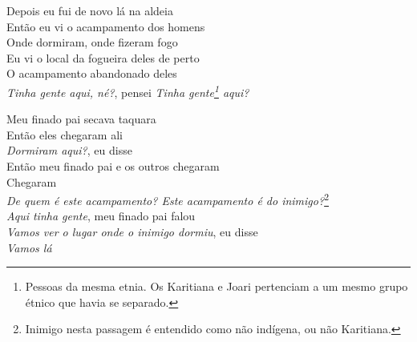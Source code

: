 \begin{linenumbers}\begingroup\raggedright
 
\noindent   Depois eu fui de novo lá na aldeia\\
  Então eu vi o acampamento dos homens\\
  Onde dormiram, onde fizeram fogo\\
  Eu vi o local da fogueira deles de perto\\
  O acampamento abandonado deles\\
  \textit{Tinha gente aqui, né?}, pensei \textit{Tinha gente\footnote{Pessoas da
   mesma etnia. Os Karitiana e Joari pertenciam a um mesmo grupo étnico
   que havia se separado.} aqui?}

\end{linenumbers}\endgroup

\bigskip

\begin{linenumbers}\begingroup\raggedright
 
\noindent   Meu finado pai secava taquara\\
  Então eles chegaram ali\\
  \textit{Dormiram aqui?}, eu disse\\
  Então meu finado pai e os outros chegaram\\
  Chegaram\\
  \textit{De quem é este acampamento? Este acampamento é do inimigo?}\footnote{Inimigo nesta passagem é entendido como não indígena, ou não Karitiana.}\\
  \textit{Aqui tinha gente}, meu finado pai falou\\
  \textit{Vamos ver o lugar onde o inimigo dormiu}, eu disse\\
  \textit{Vamos lá}
 
\end{linenumbers}\endgroup

